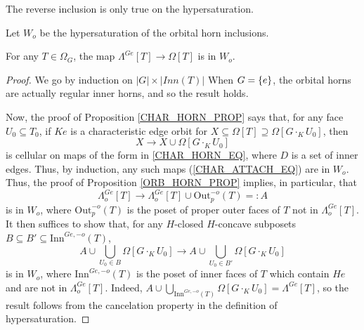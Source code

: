 \documentclass[a4paper,10pt,draft]{article}%
\numberwithin{equation}{section}%
\begin{document}
The reverse inclusion is only true on the hypersaturation.
\begin{definition}
      Let $W_o$ be the hypersaturation of the orbital horn inclusions.
\end{definition}
\begin{proposition}
      For any $T \in \Omega_G$, the map
      $\Lambda^{G e}[T] \to \Omega[T]$
      is in $W_o$.
\end{proposition}
\begin{proof}
      We go by induction on $|G| \times |Inn(T)|$ 
      When $G = \left\{e\right\}$, the orbital horns are actually regular inner horns, and so the result holds.

      Now, the proof of Proposition \ref{CHAR_HORN_PROP} says that,
      for any face $U_0 \subseteq T_0$,
      if $K e$ is a characteristic edge orbit for $X \subseteq \Omega[T] \supseteq \Omega[G \cdot_K U_0]$, then
      \begin{equation}
            \label{CHAR_ATTACH_EQ}
            X \to X \cup \Omega[G \cdot_K U_0]
      \end{equation}
      is cellular on maps of the form in \ref{CHAR_HORN_EQ}, where $D$ is a set of inner edges.
      Thus, by induction, any such maps (\ref{CHAR_ATTACH_EQ}) are in $W_o$.
      Thus, the proof of Proposition \ref{ORB_HORN_PROP} implies, in particular, that
      \begin{equation}
            \Lambda^{G e}_o[T] \to \Lambda^{G e}_o[T] \cup \mathrm{Out}^{-o}_p(T) =: A
      \end{equation}
      is in $W_o$, where $\mathrm{Out}^{-o}_p(T)$ is the poset of proper outer faces of $T$ not in $\Lambda^{G e}_o[T]$.
      It then suffices to show that, for any $H$-closed $H$-concave subposets $B \subseteq B' \subseteq \mathrm{Inn}^{G e,-o}(T)$,
      \begin{equation}
            \label{ORB_HORN_ATTACH_EQ}
            A \cup \mathop{\bigcup}\limits_{U_0 \in  B}\Omega[G \cdot_{K} U_0]
            \to
            A \cup \mathop{\bigcup}\limits_{U_0 \in B'}\Omega[G \cdot_{K} U_0]
      \end{equation}
      is in $W_o$,
      where $\mathrm{Inn}^{G e,-o}(T)$ is the poset of inner faces of $T$ which contain $H e$ and are not in $\Lambda^{G e}_o[T]$.
      Indeed, $A \cup \mathop{\bigcup}\limits_{\mathrm{Inn}^{G e,-o}(T)}\Omega[G \cdot_K U_0] = \Lambda^{G e}[T]$,
      so the result follows from the cancelation property in the definition of hypersaturation.


\end{proof}
\end{document}
